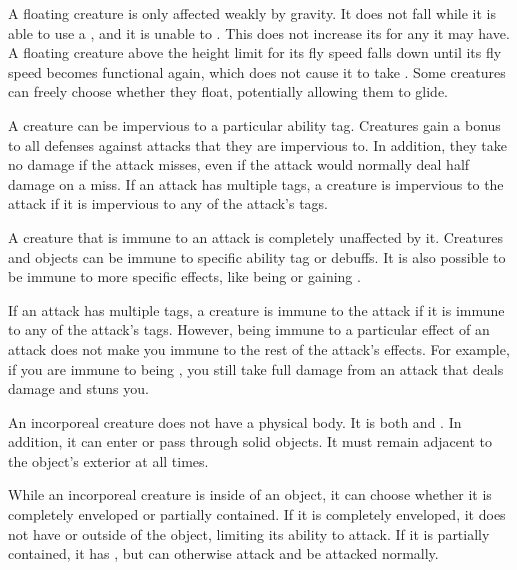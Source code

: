   A floating creature is only affected weakly by gravity.
  It does not fall while it is able to use a , and it is unable to .
  This does not increase its  for any  it may have.
  A floating creature above the height limit for its fly speed falls down until its fly speed becomes functional again, which does not cause it to take .
  Some creatures can freely choose whether they float, potentially allowing them to glide.

  A creature can be impervious to a particular ability tag.
  Creatures gain a  bonus to all defenses against attacks that they are impervious to.
  In addition, they take no damage if the attack misses, even if the attack would normally deal half damage on a miss.
  If an attack has multiple tags, a creature is impervious to the attack if it is impervious to any of the attack's tags.

  A creature that is immune to an attack is completely unaffected by it.
  Creatures and objects can be immune to specific ability tag or debuffs.
  It is also possible to be immune to more specific effects, like being \grappled or gaining .

  If an attack has multiple tags, a creature is immune to the attack if it is immune to any of the attack's tags.
  However, being immune to a particular effect of an attack does not make you immune to the rest of the attack's effects.
  For example, if you are immune to being \stunned, you still take full damage from an attack that deals damage and stuns you.

  An incorporeal creature does not have a physical body.
  It is both  and .
  In addition, it can enter or pass through solid objects.
  It must remain adjacent to the object's exterior at all times.

  While an incorporeal creature is inside of an object, it can choose whether it is completely enveloped or partially contained.
  If it is completely enveloped, it does not have  or  outside of the object, limiting its ability to attack.
  If it is partially contained, it has , but can otherwise attack and be attacked normally.

